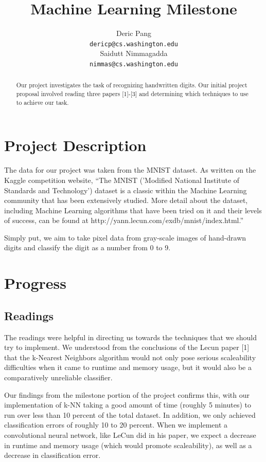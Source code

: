 \documentclass{article} %
\title{Machine Learning Milestone}
\author{
Deric Pang \\
\texttt{dericp@cs.washington.edu} \\
\And
Saidutt Nimmagadda \\
\texttt{nimmas@cs.washington.edu} \\
}
\begin{document}
\maketitle

\begin{abstract}
Our project investigates the task of recognizing handwritten digits. Our initial
project proposal involved reading three papers [1]-[3] and determining which
techniques to use to achieve our task.
\end{abstract}

\section{Project Description}

The data for our project was taken from the MNIST dataset. As written on the
Kaggle competition website, ``The MNIST
('Modified National Institute of Standards and Technology') dataset
is a classic within the Machine Learning community that has been extensively
studied. More detail about the dataset, including Machine Learning algorithms
that have been tried on it and their levels of success, can be found at
http://yann.lecun.com/exdb/mnist/index.html.''

Simply put, we aim to take pixel data from gray-scale images of hand-drawn digits
and classify the digit as a number from 0 to 9.

\section{Progress}

\subsection{Readings}
The readings were helpful in directing us towards the techniques that we should
try to implement. We understood from the
conclusions of the Lecun paper [1] that the k-Nearest Neighbors algorithm would not
only pose serious scaleability difficulties when it came to runtime and memory
usage, but it would also be a comparatively unreliable classifier.

Our findings from the milestone portion of the project confirms this, with our implementation
of k-NN taking a good amount of time (roughly 5 minutes) to run over less than
10 percent of the total dataset. In addition, we only achieved classification
errors of roughly 10 
to 20 percent. When we implement a convolutional neural network, like LeCun did
in his paper, we expect a decrease in runtime and memory usage (which
would promote scaleability), as well as a decrease in classification error.
\end{document}
